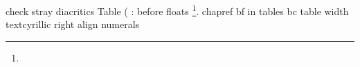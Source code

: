 check stray diacritics
Table (
: before floats
\footnote{}.
chapref
bf in tables
bc table width
textcyrillic
right align numerals